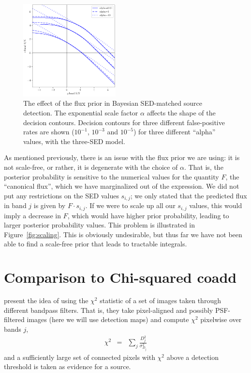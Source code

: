 \documentclass[11pt,letterpaper,linenumbers]{aastex63}
\newcommand{\figref}[1]{\mbox{Figure~\ref{#1}}}
\begin{document}
\begin{figure}
    \begin{center}
    \includegraphics[width=0.45\textwidth]{alpha-det}
    \end{center}
    \caption{The effect of the flux prior in Bayesian SED-matched source
      detection.  The exponential scale factor $\alpha$ affects the
      shape of the decision contours.  Decision contours for three different
      false-positive rates are shown ($10^{-1}$, $10^{-3}$ and $10^{-5}$) for
      three different ``alpha'' values, with the three-SED model.
    }
\end{figure}

As mentioned previously, there is an issue with the flux prior we are
using: it is not scale-free, or rather, it is degenerate with the
choice of $\alpha$.  That is, the posterior probability is sensitive
to the numerical values for the quantity $F$, the ``canonical flux'',
which we have marginalized out of the expression.  We did not put any
restrictions on the SED values $s_{i,j}$; we only stated that the
predicted flux in band $j$ is given by $F \cdot s_{i,j}$.  If we were
to scale up all our $s_{i,j}$ values, this would imply a decrease in
$F$, which would have higher prior probability, leading to larger
posterior probability values.  This problem is illustrated in
\figref{fig:scaling}.  This is obviously undesirable, but thus far we
have not been able to find a scale-free prior that leads to tractable
integrals.

\section{Comparison to Chi-squared coadd}

\cite{szalay1999} present the idea of using the $\chi^2$
statistic of a set of images taken through different bandpass filters.
That is, they take pixel-aligned and possibly PSF-filtered images
(here we will use detection maps) and compute $\chi^2$ pixelwise
over bands $j$,
\begin{eqnarray}
  \chi^2 &=& \sum_j \frac{D_j^2}{\sigma_{D_j}^2}
\end{eqnarray}
and a sufficiently large set of connected pixels with $\chi^2$ above a
detection threshold is taken as evidence for a source.
\end{document}
